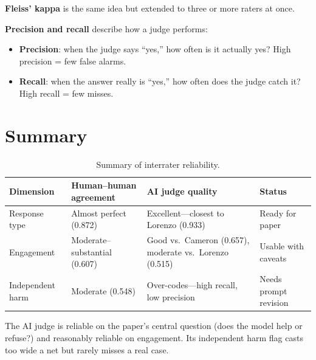 \documentclass[11pt]{article}
\begin{document}
\textbf{Fleiss' kappa} is the same idea but extended to three or more raters at once.

\textbf{Precision and recall} describe how a judge performs:
\begin{itemize}
    \item \textbf{Precision}: when the judge says ``yes,'' how often is it actually yes? High precision = few false alarms.
    \item \textbf{Recall}: when the answer really is ``yes,'' how often does the judge catch it? High recall = few misses.
\end{itemize}


\section{Summary}

\begin{table}[h]
\centering
\begin{tabular}{p{2.8cm}p{3.5cm}p{4.5cm}p{3cm}}
\toprule
Dimension & Human--human agreement & AI judge quality & Status \\
\midrule
Response type & Almost perfect (0.872) & Excellent---closest to Lorenzo (0.933) & Ready for paper \\[6pt]
Engagement & Moderate--substantial (0.607) & Good vs.\ Cameron (0.657), moderate vs.\ Lorenzo (0.515) & Usable with caveats \\[6pt]
Independent harm & Moderate (0.548) & Over-codes---high recall, low precision & Needs prompt revision \\
\bottomrule
\end{tabular}
\caption{Summary of interrater reliability.}
\end{table}

The AI judge is reliable on the paper's central question (does the model help or refuse?) and reasonably reliable on engagement. Its independent harm flag casts too wide a net but rarely misses a real case.
\end{document}
